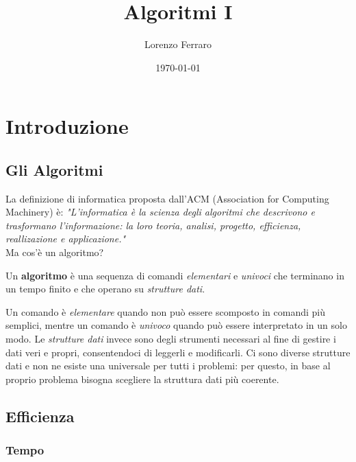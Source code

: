 \documentclass[11pt, a4paper, titlepage, oneside]{scrbook}
\title{Algoritmi I}
\author{Lorenzo Ferraro}
\date{\today}
\begin{document}
\frontmatter
\SapienzaCoverItalianoTriennale
\InfoSegnalazioni

\tableofcontents

\mainmatter

\chapter{Introduzione}

\section{Gli Algoritmi}

La definizione di informatica proposta dall'ACM (Association for Computing Machinery) è: \textit{"L'informatica è la scienza degli algoritmi che descrivono e trasformano l'informazione: la loro teoria, analisi, progetto, efficienza, reallizazione e applicazione."} \\
Ma cos'è un algoritmo?

\begin{Definizione}[Algoritmo]
\label{def-algoritmo}
Un \textbf{algoritmo} è una sequenza di comandi \textit{elementari} e \textit{univoci} che terminano in un tempo finito e che operano su \textit{strutture dati}.
\end{Definizione}

Un comando è \textit{elementare} quando non può essere scomposto in comandi più semplici, mentre un comando è \textit{univoco} quando può essere interpretato in un solo modo. Le \textit{strutture dati} invece sono degli strumenti necessari al fine di gestire i dati veri e propri, consentendoci di leggerli e modificarli. Ci sono diverse strutture dati e non ne esiste una universale per tutti i problemi: per questo, in base al proprio problema bisogna scegliere la struttura dati più coerente.

\section{Efficienza}

\subsection{Tempo}
\end{document}
